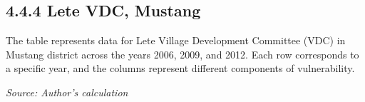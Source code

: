 \documentclass[12pt, a4paper]{article}
\begin{document}
\subsection*{4.4.4 Lete VDC, Mustang}
The table represents data for Lete Village Development Committee (VDC) in Mustang district across the years 2006, 2009, and 2012. Each row corresponds to a specific year, and the columns represent different components of vulnerability.
\begin{table}[ht]
	\captionsetup{labelformat=empty}
	\caption{Table 4.8: Mean of the HVI components for Lete VDC, Mustang}
	\label{tab:hviletecomponents}
	\textit{Source: Author's calculation}
\end{table}
\end{document}
